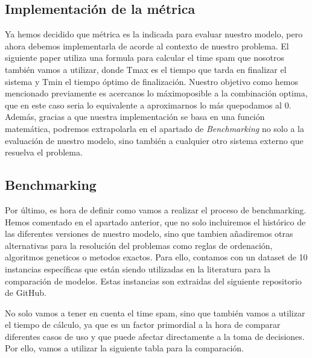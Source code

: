     \subsection{Implementación de la métrica} 
    Ya hemos decidido que métrica es la indicada para evaluar nuestro modelo, pero ahora debemos
    implementarla de acorde al contexto de nuestro problema. El siguiente paper utiliza una formula para
    calcular el time spam que nosotros también vamos a utilizar, donde Tmax es el tiempo que tarda en 
    finalizar el sistema y Tmin el tiempo óptimo de finalización. Nuestro objetivo como hemos mencionado 
    previamente es acercanos lo máximoposible a la combinación optima, que en este caso seria lo equivalente a 
    aproximarnos lo más quepodamos al 0. Además, gracias a que nuestra implementación se basa en una función 
    matemática, podremos extrapolarla en el apartado de \textit{Benchmarking} no solo a la evaluación de nuestro
    modelo, sino también a cualquier otro sistema externo que resuelva el problema. 
    
    
    \subsection{Benchmarking}
    Por último, es hora de definir como vamos a realizar el proceso de benchmarking. Hemos comentado en
    el apartado anterior, que no solo incluiremos el histórico de las diferentes versiones de nuestro
    modelo, sino que tambien añadiremos otras alternativas para la resolución del problemas como reglas de
    ordenación, algoritmos geneticos o metodos exactos. Para ello, contamos con un dataset de 10 instancias
    específicas que están siendo utilizadas en la literatura para la comparación de modelos. Estas instancias
    son extraidas del siguiente repositorio \cite*{ptal} de GitHub.\medskip

    No solo vamos a tener en cuenta el time spam, sino que también vamos a utilizar el tiempo de cálculo,
    ya que es un factor primordial a la hora de comparar diferentes casos de uso y que puede afectar
    directamente a la toma de decisiones. Por ello, vamos a utilizar la siguiente tabla para la comparación. 


